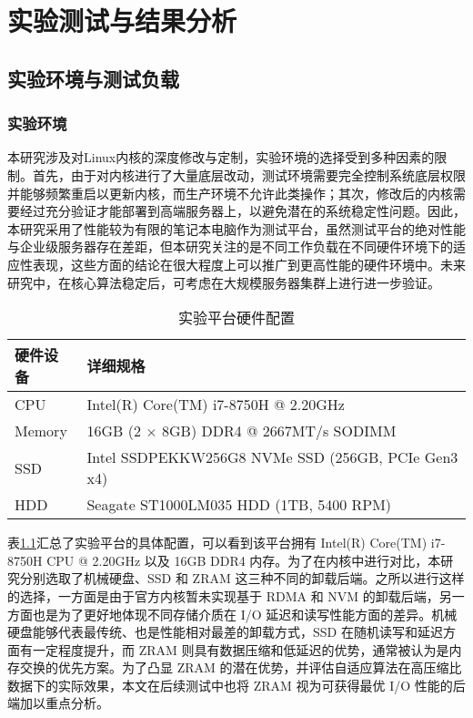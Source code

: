 
\chapter{实验测试与结果分析}

\section{实验环境与测试负载}

\subsection{实验环境}

本研究涉及对Linux内核的深度修改与定制，实验环境的选择受到多种因素的限制。首先，由于对内核进行了大量底层改动，测试环境需要完全控制系统底层权限并能够频繁重启以更新内核，而生产环境不允许此类操作；其次，修改后的内核需要经过充分验证才能部署到高端服务器上，以避免潜在的系统稳定性问题。因此，本研究采用了性能较为有限的笔记本电脑作为测试平台，虽然测试平台的绝对性能与企业级服务器存在差距，但本研究关注的是不同工作负载在不同硬件环境下的适应性表现，这些方面的结论在很大程度上可以推广到更高性能的硬件环境中。未来研究中，在核心算法稳定后，可考虑在大规模服务器集群上进行进一步验证。

\begin{table}[ht]
    \centering
    \caption{实验平台硬件配置}
    \label{tab:hardware_config}
    \begin{tabular}{ll}
        \toprule
        硬件设备&详细规格\\
        \midrule
        CPU & Intel(R) Core(TM) i7-8750H @ 2.20GHz \\
        Memory & 16GB (2 \(\times\) 8GB) DDR4 @ 2667MT/s SODIMM \\
        SSD & Intel SSDPEKKW256G8 NVMe SSD (256GB, PCIe Gen3 x4)  \\
        HDD & Seagate ST1000LM035 HDD (1TB, 5400 RPM) \\
        \bottomrule
    \end{tabular}
\end{table}
表\ref{tab:hardware_config}汇总了实验平台的具体配置，可以看到该平台拥有 Intel(R) Core(TM) i7-8750H CPU @ 2.20GHz 以及 16GB DDR4 内存。为了在内核中进行对比，本研究分别选取了机械硬盘、SSD 和 ZRAM 这三种不同的卸载后端。之所以进行这样的选择，一方面是由于官方内核暂未实现基于 RDMA 和 NVM 的卸载后端，另一方面也是为了更好地体现不同存储介质在 I/O 延迟和读写性能方面的差异。机械硬盘能够代表最传统、也是性能相对最差的卸载方式，SSD 在随机读写和延迟方面有一定程度提升，而 ZRAM 则具有数据压缩和低延迟的优势，通常被认为是内存交换的优先方案。为了凸显 ZRAM 的潜在优势，并评估自适应算法在高压缩比数据下的实际效果，本文在后续测试中也将 ZRAM 视为可获得最优 I/O 性能的后端加以重点分析。



